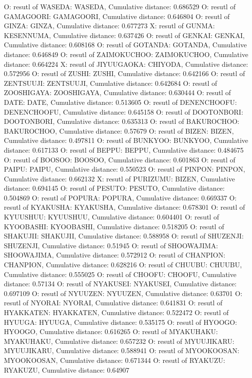 O: resutl of WASEDA: WASEDA, Cumulative distance: 0.686529
O: resutl of GAMAGOORI: GAMAGOORI, Cumulative distance: 0.646804
O: resutl of GINZA: GINZA, Cumulative distance: 0.677273
X: resutl of GUNMA: KESENNUMA, Cumulative distance: 0.637426
O: resutl of GENKAI: GENKAI, Cumulative distance: 0.608168
O: resutl of GOTANDA: GOTANDA, Cumulative distance: 0.646849
O: resutl of ZAIMOKUCHOO: ZAIMOKUCHOO, Cumulative distance: 0.664224
X: resutl of JIYUUGAOKA: CHIYODA, Cumulative distance: 0.572956
O: resutl of ZUSHI: ZUSHI, Cumulative distance: 0.642166
O: resutl of ZENTSUUJI: ZENTSUUJI, Cumulative distance: 0.642684
O: resutl of ZOOSHIGAYA: ZOOSHIGAYA, Cumulative distance: 0.630444
O: resutl of DATE: DATE, Cumulative distance: 0.513605
O: resutl of DENENCHOOFU: DENENCHOOFU, Cumulative distance: 0.645158
O: resutl of DOOTONBORI: DOOTONBORI, Cumulative distance: 0.635313
O: resutl of BAKUROCHOO: BAKUROCHOO, Cumulative distance: 0.57679
O: resutl of BIZEN: BIZEN, Cumulative distance: 0.497811
O: resutl of BUNKYOO: BUNKYOO, Cumulative distance: 0.617133
O: resutl of BEPPU: BEPPU, Cumulative distance: 0.484675
O: resutl of BOOSOO: BOOSOO, Cumulative distance: 0.601863
O: resutl of PAIPU: PAIPU, Cumulative distance: 0.550523
O: resutl of PINPON: PINPON, Cumulative distance: 0.662132
X: resutl of PURIZUMU: BIZEN, Cumulative distance: 0.694145
O: resutl of PESUTO: PESUTO, Cumulative distance: 0.504869
O: resutl of POPURA: POPURA, Cumulative distance: 0.669337
O: resutl of KYAKUSHA: KYAKUSHA, Cumulative distance: 0.678301
O: resutl of KYUUSHUU: KYUUSHUU, Cumulative distance: 0.604401
O: resutl of KYOOBASHI: KYOOBASHI, Cumulative distance: 0.518205
O: resutl of SHAKUJII: SHAKUJII, Cumulative distance: 0.588958
O: resutl of SHUZENJI: SHUZENJI, Cumulative distance: 0.51945
O: resutl of SHOOWAJIMA: SHOOWAJIMA, Cumulative distance: 0.572912
O: resutl of CHANPION: CHANPION, Cumulative distance: 0.628216
O: resutl of CHUUBU: CHUUBU, Cumulative distance: 0.555025
O: resutl of CHOOFU: CHOOFU, Cumulative distance: 0.57134
O: resutl of NYAKUSEI: NYAKUSEI, Cumulative distance: 0.697109
O: resutl of NYUUZEN: NYUUZEN, Cumulative distance: 0.63701
O: resutl of NYORAI: NYORAI, Cumulative distance: 0.641831
O: resutl of HYAKKATEN: HYAKKATEN, Cumulative distance: 0.522472
O: resutl of HYUUGA: HYUUGA, Cumulative distance: 0.535175
O: resutl of HYOOGO: HYOOGO, Cumulative distance: 0.616265
O: resutl of MYAKUHAKU: MYAKUHAKU, Cumulative distance: 0.657232
O: resutl of MYUUJIKARU: MYUUJIKARU, Cumulative distance: 0.588941
O: resutl of MYOOKOOSAN: MYOOKOOSAN, Cumulative distance: 0.671344
O: resutl of RYAKUZU: RYAKUZU, Cumulative distance: 0.64907
